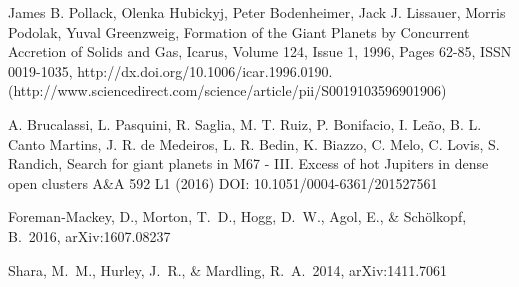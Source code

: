 \documentclass[12pt]{article}
\begin{document}
\clearpage

\begin{thebibliography}{9}

James B. Pollack, Olenka Hubickyj, Peter Bodenheimer, Jack J. Lissauer, Morris Podolak, Yuval Greenzweig, Formation of the Giant Planets by Concurrent Accretion of Solids and Gas, Icarus, Volume 124, Issue 1, 1996, Pages 62-85, ISSN 0019-1035, http://dx.doi.org/10.1006/icar.1996.0190.
(http://www.sciencedirect.com/science/article/pii/S0019103596901906)

A.  Brucalassi, L.  Pasquini, R.  Saglia, M. T.  Ruiz, P.  Bonifacio, I.  Leão, B. L.  Canto Martins, J. R.  de Medeiros, L. R.  Bedin, K.  Biazzo, C.  Melo, C.  Lovis, S.  Randich,
Search for giant planets in M67 - III. Excess of hot Jupiters in dense open clusters
A\&A 592 L1 (2016)
DOI: 10.1051/0004-6361/201527561

Foreman-Mackey, D., Morton, T.~D., Hogg, D.~W., Agol, E., \& Sch{\"o}lkopf, B.\ 2016, arXiv:1607.08237 

 Shara, M.~M., Hurley, J.~R., \& Mardling, R.~A.\ 2014, arXiv:1411.7061 

%
%
%
%
%
\end{thebibliography}
\end{document}

